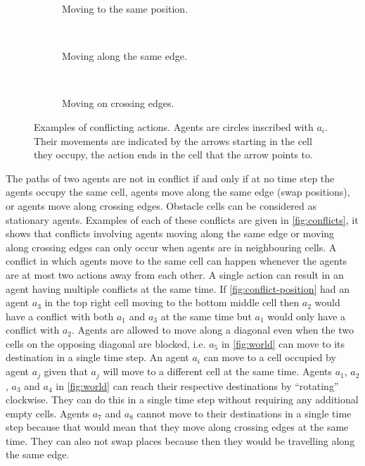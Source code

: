 \begin{figure}[t]
    \centering
    \begin{subfigure}[b]{.3\textwidth}
        \centering
        \def\svgscale{.7}
        
        \caption{Moving to the same position.}
        \label{fig:conflict-position}
    \end{subfigure}
    ~
    \begin{subfigure}[b]{.3\textwidth}
        \centering
        \def\svgscale{.7}
        
        \caption{Moving along the same edge.}
        \label{fig:conflict-same}
    \end{subfigure}
    ~
    \begin{subfigure}[b]{.3\textwidth}
        \centering
        \def\svgscale{.7}
        
        \caption{Moving on crossing edges.}
        \label{fig:conflict-crossing}
    \end{subfigure}
    \caption{Examples of conflicting actions. Agents are circles inscribed with
        $a_i$. Their movements are indicated by the arrows starting in the cell
        they occupy, the action ends in the cell that the arrow points to.}
    \label{fig:conflicts}
\end{figure}

The paths of two agents are not in conflict if and only if at no time step the 
agents
occupy the same cell, agents move along the same edge (swap positions), or
agents move along crossing edges. Obstacle cells can be considered as
stationary agents. Examples of each of these conflicts are given
in \autoref{fig:conflicts}, it shows that conflicts involving agents moving
along the same edge or moving along crossing edges can only occur when agents
are in neighbouring cells. A conflict in which agents move to the same cell can
happen whenever the agents are at most two actions away from each other. A
single action can result in an agent having multiple conflicts at the same
time. If \autoref{fig:conflict-position} had an agent $a_3$ in the top right
cell moving to the bottom middle cell then $a_2$ would have a conflict with
both $a_1$ and $a_3$ at the same time but $a_1$ would only have a conflict with 
$a_2$.
Agents are allowed to move along a diagonal even when the two cells on the
opposing diagonal are blocked, i.e. $a_5$ in \autoref{fig:world} can move to its
destination in a single time step. An agent $a_i$ can move to a cell occupied by
agent $a_j$ given that $a_j$ will move to a different cell at the same time.
Agents $a_1$, $a_2$, $a_3$ and $a_4$ in \autoref{fig:world} can reach their
respective destinations by ``rotating'' clockwise. They can do this in a single
time step without requiring any additional empty cells. Agents $a_7$ and $a_8$
cannot move to their
destinations in a single time step because that would mean that they move along
crossing edges at the same time. They can also not swap places because then
they would be travelling along the same edge.